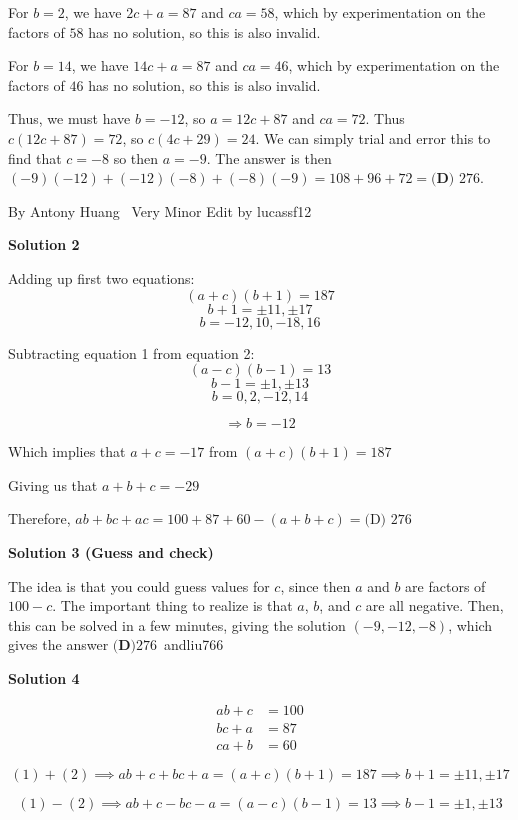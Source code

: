 \begin{enumerate}
 For $b=2$, we have $2c+a=87$ and $ca=58$, which by experimentation on the factors of $58$ has no solution, so this is also invalid.

 For $b=14$, we have $14c+a=87$ and $ca=46$, which by experimentation on the factors of $46$ has no solution, so this is also invalid.

 Thus, we must have $b=-12$, so $a=12c+87$ and $ca=72$. Thus $c(12c+87)=72$, so $c(4c+29)=24$. We can simply trial and error this to find that $c=-8$ so then $a=-9$. The answer is then $(-9)(-12)+(-12)(-8)+(-8)(-9)=108+96+72=\boxed{\textbf{(D) }276}$.

 By Antony Huang ~Very Minor Edit by lucassf12

 



\textbf{Solution 2}

Adding up first two equations: 
 \[(a+c)(b+1)=187\]
 \[b+1=\pm 11,\pm 17\]
 \[b=-12,10,-18,16\]

 Subtracting equation 1 from equation 2: 
 \[(a-c)(b-1)=13\]
 \[b-1=\pm 1,\pm 13\]
 \[b=0,2,-12,14\]

 \[\Rightarrow b=-12\]

 Which implies that $a+c=-17$ from $(a+c)(b+1)=187$

 Giving us that $a+b+c=-29$

 Therefore, $ab+bc+ac=100+87+60-(a+b+c)=\boxed{\text{(D) }276}$




\textbf{Solution 3 (Guess and check)}

The idea is that you could guess values for $c$, since then $a$ and $b$ are factors of $100 - c$. The important thing to realize is that $a$, $b$, and $c$ are all negative. Then, this can be solved in a few minutes, giving the solution $(-9, -12, -8)$, which gives the answer $\boxed{\textbf{(D)} 276}$~andliu766

 


 



\textbf{Solution 4}


 \begin{align} ab + c &= 100 \\ bc + a &= 87 \\ ca + b &= 60 \end{align}

 \[(1) + (2) \implies  ab + c +bc + a = (a+c)(b+1)=187\implies b+1=\pm 11,\pm 17\]

 \[(1) - (2) \implies ab + c - bc - a = (a-c)(b-1)=13\implies b-1=\pm 1,\pm 13\]


\end{enumerate}
